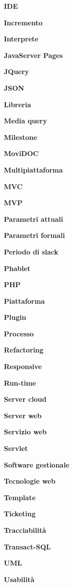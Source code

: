 \textbf{IDE}

\textbf{Incremento}

\textbf{Interprete}

\textbf{JavaServer Pages}

\textbf{JQuery}

\textbf{JSON}

\textbf{Libreria}

\textbf{Media query}

\textbf{Milestone}

\textbf{MoviDOC}

\textbf{Multipiattaforma}

\textbf{MVC}

\textbf{MVP}

\textbf{Parametri attuali}

\textbf{Parametri formali}

\textbf{Periodo di slack}

\textbf{Phablet}

\textbf{PHP}

\textbf{Piattaforma}

\textbf{Plugin}

\textbf{Processo}

\textbf{Refactoring}

\textbf{Responsive}

\textbf{Run-time}

\textbf{Server cloud}

\textbf{Server web}

\textbf{Servizio web}

\textbf{Servlet}

\textbf{Software gestionale}

\textbf{Tecnologie web}

\textbf{Template}

\textbf{Ticketing}

\textbf{Tracciabilità}

\textbf{Transact-SQL}

\textbf{UML}

\textbf{Usabilità}